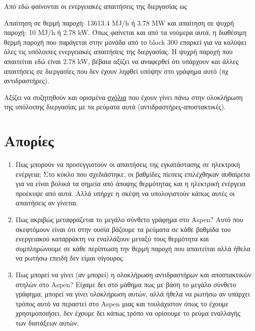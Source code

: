 \documentclass[11pt]{article}
\begin{document}
Από εδώ φαίνονται οι ενεργειακές απαιτήσεις της διεργασίας ως

Απαίτηση σε θερμή παροχή: 13613.4 MJ/h ή 3.78 MW και απαίτηση σε ψυχρή παροχή: 10 MJ/h ή 2.78 kW. Όπως φαίνεται και από τα νούμερα αυτά, η διαθέσιμη θερμή παροχή που παράγεται στην μονάδα από το block 300 επαρκεί για να καλύψει όλες τις υπόλοιπες ενεργειακές απαιτήσεις της διεργασίας. Η ψυχρή παροχή που απαιτείται εδώ είναι 2.78 kW, βέβαια αξίζει να αναφερθεί ότι υπάρχουν και άλλες απαιτήσεις σε διεργασίες που δεν έχουν ληφθεί υπόψην στο γράφημα αυτό (πχ αντιδραστήρες).

Αξίζει να συζητηθούν και ορισμένα \href{https://github.com/Vidianos-Giannitsis/Process-Design/blob/master/energy\_integration.org\#\%CF\%83\%CF\%87\%CF\%8C\%CE\%BB\%CE\%B9\%CE\%B1-\%CE\%B3\%CE\%B9\%CE\%B1-\%CF\%84\%CE\%B7\%CE\%BD-\%CE\%BF\%CE\%BB\%CE\%BF\%CE\%BA\%CE\%BB\%CE\%AE\%CF\%81\%CF\%89\%CF\%83\%CE\%B7-\%CE\%B4\%CE\%B9\%CE\%AC\%CF\%86\%CE\%BF\%CF\%81\%CF\%89\%CE\%BD-\%CE\%BA\%CE\%BF\%CE\%BC\%CE\%BC\%CE\%B1\%CF\%84\%CE\%B9\%CF\%8E\%CE\%BD}{σχόλια} που έχουν γίνει πάνω στην ολοκλήρωση της υπόλοιπης διεργασίας με τα ρεύματα αυτά (αντιδραστήρες-αποστακτικές).

\section{Απορίες}
\label{sec:org845481b}
\begin{enumerate}
\item Πως μπορούν να προσεγγιστούν οι απαιτήσεις της εγκατάστασης σε ηλεκτρική ενέργεια; Στο κύκλο που σχεδιάστηκε, οι βαθμίδες πίεσεις επιλέχθηκαν αυθαίρετα για να είναι βολικά τα σημεία από άποψης θερμότητας και η ηλεκτρική ενέργεια προέκυψε από αυτά. Αλλά υπήρχε η σκέψη να υπολογιστούν κάπως αυτές οι απαιτήσεις αν γίνεται.

\item Πως ακριβώς μεταφράζεται το μεγάλο σύνθετο γράφημα στο Aspen? Αυτό που σκεφτόμουν είναι ότι στην ουσία βάζουμε τα ρεύματα σε κάθε βαθμίδα του ενεργειακού καταρράκτη να εναλλάξουν μεταξύ τους θερμότητα και συμπληρώνουμε σε κάθε περίπτωση την θερμή παροχή που απαιτείται αλλά ήθελα να ρωτήσω επειδή δεν είμαι σίγουρος.

\item Πως μπορεί να γίνει (αν μπορεί) η ολοκλήρωση αντιδραστήρων και αποστακτικών στηλών στο Aspen? Είχαμε δει στο μάθημα πως με βάση το μεγάλο σύνθετο γράφημα, μπορεί να γίνει ολοκλήρωση αυτών, αλλά ήθελα να ρωτήσω αν υπάρχει τρόπος αυτό να περαστεί στο Aspen μιας και τουλάχιστον όπως το έχουμε χρησιμοποιήσει, δεν έχουμε δει κάπως τρόπο να ορίσουμε το ρεύμα εναλλαγής των διατάξεων αυτών.
\end{enumerate}
\end{document}
